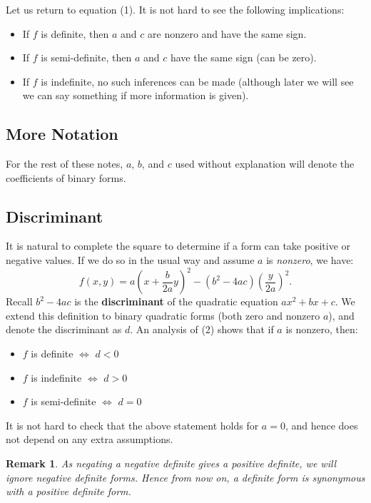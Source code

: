 \documentclass[12pt]{article}
\newtheorem*{remark}{Remark}
\begin{document}
\subsubsection{}
Let us return to equation (1). It is not hard to see the following implications:
\begin{itemize}
    \item If $f$ is definite, then $a$ and $c$ are nonzero and have the same sign.
    \item If $f$ is semi-definite, then $a$ and $c$ have the same sign (can be zero).
    \item If $f$ is indefinite, no such inferences can be made (although later we will see we can say something if more information is given).
\end{itemize}

\subsection{More Notation}
For the rest of these notes, $a$, $b$, and $c$ used without explanation will denote the coefficients of binary forms.

\subsection{Discriminant}
It is natural to complete the square to determine if a form can take positive or negative values. If we do so in the usual way and assume $a$ is \textit{nonzero}, we have:
\begin{equation}
    f(x,y) = a(x + \frac{b}{2a}y)^{2} - (b^{2}-4ac)(\frac{y}{2a})^{2}.
\end{equation}
Recall $b^{2}-4ac$ is the \textbf{discriminant} of the quadratic equation $ax^{2} + bx + c$. We extend this definition to binary quadratic forms (both zero and nonzero $a$), and denote the discriminant as $d$. An analysis of (2) shows that if $a$ is nonzero, then:
\begin{itemize}
    \item $f$ is definite $\iff$ $d < 0$
    \item $f$ is indefinite $\iff$ $d > 0$
    \item $f$ is semi-definite $\iff$ $d = 0$
\end{itemize}
It is not hard to check that the above statement holds for $a = 0$, and hence does not depend on any extra assumptions.
\begin{remark}
    As negating a negative definite gives a positive definite, we will ignore negative definite forms. Hence from now on, a definite form is synonymous with a positive definite form.
\end{remark}
\end{document}
